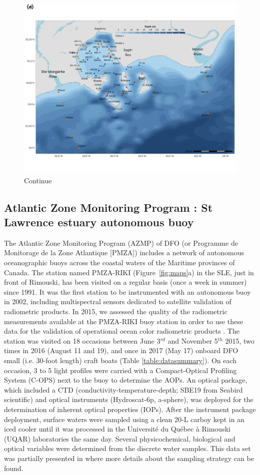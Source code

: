 \documentclass[essd, manuscript]{copernicus}
\begin{document}
\begin{figure}[!ht]
\includegraphics[width=12cm]{Figures/Fig1d.png}
\caption{Continue}
\end{figure}

\subsection{Atlantic Zone Monitoring Program : St Lawrence estuary autonomous buoy}
\label{sec:AZMP}
The Atlantic Zone Monitoring Program (AZMP) of DFO (or Programme de Monitorage de la Zone Atlantique [PMZA]) includes a network of autonomous oceanographic buoys across the coastal waters of the Maritime provinces of Canada. The station named PMZA-RIKI (Figure~\ref{fig:maps}a) in the SLE, just in front of Rimouski, has been visited on a regular basis (once a week in summer) since 1991. It was the first station to be instrumented with an autonomous buoy in 2002, including multispectral sensors dedicated to satellite validation of radiometric products. In 2015, we assessed the quality of the radiometric measurements available at the PMZA-RIKI buoy station in order to use these data for the validation of operational ocean color radiometric products \citep{Belanger2017}. The station was visited on 18 occasions between June 3$^{rd}$ and November 5$^{th}$ 2015, two times in 2016 (August 11 and 19), and once in 2017 (May 17) onboard DFO small (i.e. 30-foot length) craft boats (Table \ref{table:datasummary}).  On each occasion, 3 to 5 light profiles were carried with a Compact-Optical Profiling System (C-OPS) next to the buoy to determine the AOPs. An optical package, which included a CTD (conductivity-temperature-depth; SBE19 from Seabird scientific) and optical instruments (Hydroscat-6p, a-sphere), was deployed for the determination of inherent optical properties (IOPs). After the instrument package deployment, surface waters were sampled using a clean 20-L carboy kept in an iced cooler until it was processed in the Université du Québec à Rimouski (UQAR) laboratories the same day. Several physicochemical, biological and optical variables were determined from the discrete water samples. This data set was partially presented in \citet{Belanger2017} where more details about the sampling strategy can be found.\\ 
\end{document}
